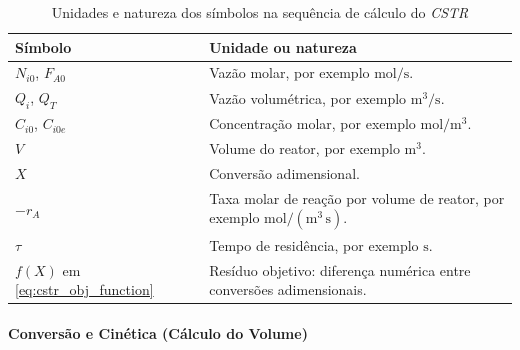 \begin{table}[H]
    \centering
    \caption{Unidades e natureza dos símbolos na sequência de cálculo do \textit{CSTR}}
    \label{tab:unidades-cstr}
    \begin{tabular}{|p{}|p{}|}
        \hline
        \textbf{Símbolo} & \textbf{Unidade ou natureza} \\ \hline
        $N_{i0}$, $F_{A0}$ & Vazão molar, por exemplo $\mathrm{mol/s}$. \\ \hline
        $Q_i$, $Q_T$ & Vazão volumétrica, por exemplo $\mathrm{m^3/s}$. \\ \hline
        $C_{i0}$, $C_{i0e}$ & Concentração molar, por exemplo $\mathrm{mol/m^3}$. \\ \hline
        $V$ & Volume do reator, por exemplo $\mathrm{m^3}$. \\ \hline
        $X$ & Conversão adimensional. \\ \hline
        $-r_A$ & Taxa molar de reação por volume de reator, por exemplo $\mathrm{mol/(m^3\,s)}$. \\ \hline
        $\tau$ & Tempo de residência, por exemplo $\mathrm{s}$. \\ \hline
        $f(X)$ em \ref{eq:cstr_obj_function} & Resíduo objetivo: diferença numérica entre conversões adimensionais. \\ \hline
    \end{tabular}
\end{table}

\paragraph{Conversão e Cinética (Cálculo do Volume)}

